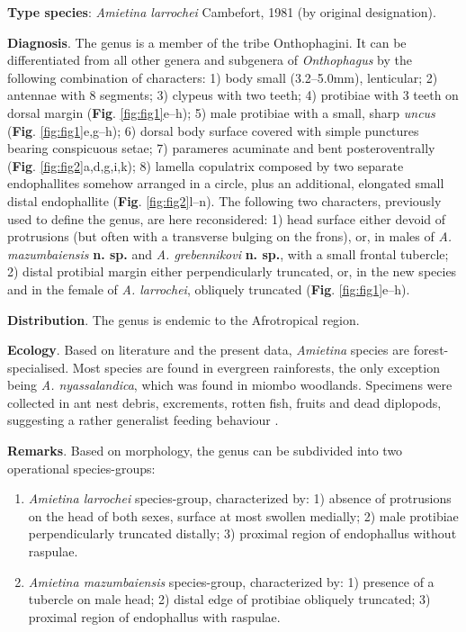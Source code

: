 \documentclass[fleqn,10pt,lineno]{wlpeerj}
\begin{document}
\textbf{Type species}: \textit{Amietina larrochei} Cambefort, 1981 (by original designation).

\textbf{Diagnosis}. The genus is a member of the tribe Onthophagini. It can be differentiated from all other genera and subgenera of \textit{Onthophagus} by the following combination of characters: 1) body small (3.2--5.0mm), lenticular; 2) antennae with 8 segments; 3) clypeus with two teeth; 4) protibiae with 3 teeth on dorsal margin (\textbf{Fig}. \ref{fig:fig1}e--h); 5) male protibiae with a small, sharp \textit{uncus} (\textbf{Fig}. \ref{fig:fig1}e,g--h); 6) dorsal body surface covered with simple punctures bearing conspicuous setae; 7) parameres acuminate and bent posteroventrally (\textbf{Fig}. \ref{fig:fig2}a,d,g,i,k); 8) lamella copulatrix composed by two separate endophallites somehow arranged in a circle, plus an additional, elongated small distal endophallite (\textbf{Fig}. \ref{fig:fig2}l--n). 
The following two characters, previously used to define the genus, are here reconsidered: 1) head surface either devoid of protrusions (but often with a transverse bulging on the frons), or, in males of \textit{A. mazumbaiensis} \textbf{n. sp.} and \textit{A. grebennikovi} \textbf{n. sp.}, with a small frontal tubercle; 2) distal protibial margin either perpendicularly truncated, or, in the new species and in the female of \textit{A. larrochei}, obliquely truncated (\textbf{Fig}. \ref{fig:fig1}e--h).

\textbf{Distribution}. The genus is endemic to the Afrotropical region.

\textbf{Ecology}. Based on literature \citep{branco1988deux} and the present data, \textit{Amietina} species are forest-specialised. Most species are found in evergreen rainforests, the only exception being \textit{A. nyassalandica}, which was found in miombo woodlands. Specimens were collected in ant nest debris, excrements, rotten fish, fruits and dead diplopods, suggesting a rather generalist feeding behaviour \citep{branco1988deux, moretto2010onthophagus}.

\textbf{Remarks}. Based on morphology, the genus can be subdivided into two operational species-groups:
\begin{enumerate}
    \item \textit{Amietina larrochei} species-group, characterized by: 1) absence of protrusions on the head of both sexes, surface at most swollen medially; 2) male protibiae perpendicularly truncated distally; 3) proximal region of endophallus without raspulae.
    \item \textit{Amietina mazumbaiensis} species-group, characterized by: 1) presence of a tubercle on male head; 2) distal edge of protibiae obliquely truncated; 3) proximal region of endophallus with raspulae.
\end{enumerate}
\end{document}
